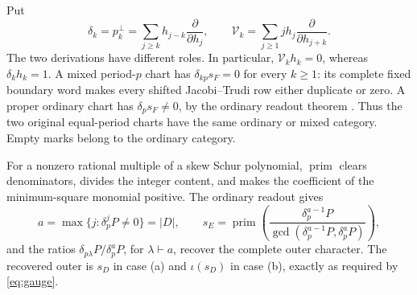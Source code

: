 \documentclass[11pt,a4paper]{amsart}
\numberwithin{equation}{section}
\theoremstyle{plain}
\theoremstyle{definition}
\newcommand{\Vop}{\mathcal V}
\newcommand{\ii}{\iota}
\begin{document}
Put
\[
 \delta_k=p_k^\perp=\sum_{j\ge k}h_{j-k}\frac{\partial}{\partial h_j},\qquad
 \Vop_k=\sum_{j\ge1}j h_j\frac{\partial}{\partial h_{j+k}}.
\]
The two derivations have different roles.  In particular, \(\Vop_k h_k=0\), whereas \(\delta_k h_k=1\).  A mixed period-\(p\) chart has \(\delta_{kp}s_F=0\) for every \(k\ge1\): its complete fixed boundary word makes every shifted Jacobi--Trudi row either duplicate or zero.  A proper ordinary chart has \(\delta_p s_F\ne0\), by the ordinary readout theorem \cite[Factor recovery at a prescribed period and mixed-vanishing lemma]{Shields2026Readout}.  Thus the two original equal-period charts have the same ordinary or mixed category.  Empty marks belong to the ordinary category.

For a nonzero rational multiple of a skew Schur polynomial, \(\operatorname{prim}\) clears denominators, divides the integer content, and makes the coefficient of the minimum-square monomial positive.  The ordinary readout gives
\begin{equation}\label{rt:ordinary-readout}
 a=\max\{j:\delta_p^jP\ne0\}=|D|,\qquad
 s_E=\operatorname{prim}\left(
 \frac{\delta_p^{a-1}P}{\gcd(\delta_p^{a-1}P,\delta_p^aP)}\right),
\end{equation}
and the ratios \(\delta_{p\lambda}P/\delta_p^aP\), for \(\lambda\vdash a\), recover the complete outer character.  The recovered outer is \(s_D\) in case (a) and \(\ii(s_D)\) in case (b), exactly as required by \eqref{eq:gauge}.
\end{document}
